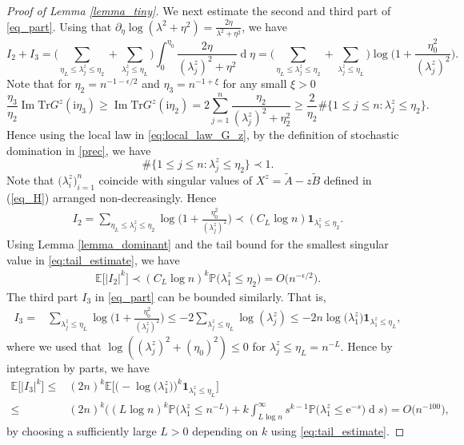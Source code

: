 \documentclass[10pt,reqno]{amsart}
\numberwithin{equation}{section}
\numberwithin{figure}{section}
\theoremstyle{plain}
\newcommand{\ii}{\mathrm{i}}
\newcommand{\wt}{\widetilde}
\newcommand{\<}{\langle}
\renewcommand{\>}{\rangle}
\newcommand{\E}{\mathbb{E}}
\renewcommand{\P}{{\mathbb P}}
\newcommand{\dd}{\operatorname{d}\!{}}
\renewcommand{\Im}{\operatorname{Im}}
\begin{document}
\begin{proof}[Proof of Lemma \ref{lemma_tiny}]
	
	
	
	
	
	
	
	
	
	
	
	
	
	
	
	We next estimate the second and  third part of \eqref{eq_part}.  Using that $\partial_\eta \log(\lambda^2+\eta^2)=\frac{2\eta}{\lambda^2+\eta^2}$, we have
	$$I_2+I_3=\Big(\sum_{\eta_L\leq \lambda^z_j \leq \eta_2} +\sum_{\lambda^z_j\leq \eta_L}\Big)  \int_{0}^{\eta_0}  \frac{2\eta}{(\lambda_j^z)^2+\eta^2} \dd \eta =\Big(\sum_{\eta_L\leq \lambda^z_j \leq \eta_2} +\sum_{\lambda^z_j\leq \eta_L}\Big) \log \Big( 1+\frac{\eta_0^2}{(\lambda^z_j)^2}\Big).$$
	Note that for $\eta_2=n^{-1-\epsilon/2}$ and $\eta_3=n^{-1+\xi}$ for any small $\xi>0$
	$$ \frac{\eta_3}{\eta_2} \Im\mathrm{Tr}G^{z}(\ii \eta_3) \geq \Im\mathrm{Tr}G^{z}(\ii \eta_2)=2\sum_{j=1}^{n} \frac{\eta_2}{(\lambda^z_j)^2+\eta_2^2}  \geq \frac{2}{\eta_2} \# \big\{ 1\leq j\leq n: \lambda_j^z \leq \eta_2 \big\}.$$
	Hence using the local law in \eqref{eq:local_law_G_z}, by the definition of stochastic domination in \eqref{prec}, we have
	$$\# \big\{ 1\leq j\leq n: \lambda_j^z \leq \eta_2 \big\} \prec 1.$$
	Note that $\big(\lambda^{z}_{ i}\big)_{i=1}^n$ coincide with singular values of $X^z=\wt A-z\wt B$ defined in (\ref{eq_H}) arranged non-decreasingly. Hence
	\begin{align}
		I_2= \sum_{\eta_L \leq  \lambda^z_j \leq \eta_2} \log \Big( 1+\frac{\eta_0^2}{(\lambda^z_j)^2}\Big) \prec (C_L \log n) \mathbf{1}_{ \lambda^z_1 \leq \eta_2}.
	\end{align}
	Using Lemma \ref{lemma_dominant} and the tail bound for the smallest singular value in \eqref{eq:tail_estimate}, we have
	\begin{align}\label{eq_middle}
		\E\big[ |I_2|^k \big] \prec  (C_L \log n)^k \P\big( \lambda^z_1 \leq \eta_2\big)=O\big( n^{-\epsilon/2}\big).
	\end{align}	
	The third part $I_3$ in \eqref{eq_part} can be bounded similarly. That is,
	\begin{align}
		I_3=& \sum_{ \lambda^z_j \leq \eta_L} \log \Big( 1+\frac{\eta_0^2}{(\lambda^z_j)^2}\Big) \leq  -2 \sum_{ \lambda^z_j \leq \eta_L} \log (\lambda^z_j) \leq 
		-2n \log \big(\lambda^z_1\big) \mathbf{1}_{\lambda^z_1 \leq \eta_L},
	\end{align}
	where we used that $\log ((\lambda^z_j)^2 + (\eta_0)^2) \leq 0$ 
	for $\lambda^z_j \leq \eta_L=n^{-L}$. Hence by integration by parts, we have
	\begin{align}
		\E\big[ |I_3|^k\big]\leq &  (2n)^k \mathbb{E} \Big[\Big(-\log \big(\lambda^z_1\big) \Big)^k \mathbf{1}_{\lambda^z_1 \leq \eta_L}  \Big]\\
		\leq&  (2n)^k\bigg(
		(L \log n)^k \mathbb P \big(\lambda^z_1 
		\leq n^{-L} \big) + k 
		\int_{L \log n}^{\infty} s^{k-1} \mathbb{P}\big(\lambda^z_1 \leq \mathrm{e}^{-s} \big)\dd s \bigg)=O\big( n^{-100}\big),\label{eq_third}
	\end{align}
	by choosing a sufficiently large $L>0$ depending on $k$ using \eqref{eq:tail_estimate}.
	

\end{proof}
\end{document}
